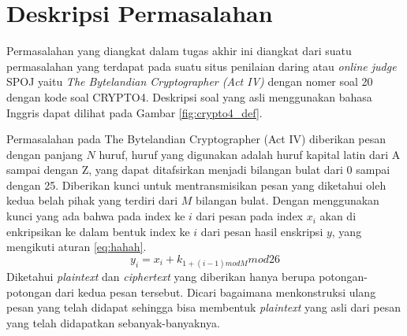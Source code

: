 	\section{Deskripsi Permasalahan}
	\label{chapter:dasar-teori}
	Permasalahan yang diangkat dalam tugas akhir ini diangkat dari suatu permasalahan yang terdapat pada suatu situs penilaian daring atau \textit{online judge} SPOJ yaitu \textit{The Bytelandian Cryptographer (Act IV)} dengan nomer soal 20 dengan kode soal CRYPTO4. Deskripsi soal yang asli menggunakan bahasa Inggris dapat dilihat pada Gambar \ref{fig:crypto4_def}\cite{piwakowski_crypto4_2004}.
	
	
	 Permasalahan pada The Bytelandian Cryptographer (Act IV) diberikan pesan dengan panjang $N$ huruf, huruf yang digunakan adalah huruf kapital latin dari A sampai dengan Z, yang dapat ditafsirkan menjadi bilangan bulat dari 0 sampai dengan 25. Diberikan kunci untuk mentransmisikan pesan yang diketahui oleh kedua belah pihak yang terdiri dari $M$ bilangan bulat. Dengan menggunakan kunci yang ada bahwa pada index ke $i$ dari pesan pada index $x_i$ akan di enkripsikan ke dalam bentuk index ke $i$ dari pesan hasil enskripsi $y$, yang mengikuti aturan \ref{eq:hahah}.
	\begin{equation}
	y_i=x_i+k_{1+(i-1)mod M} mod 26 
	\label{eq:hahah}
	\end{equation}		 
	 Diketahui \textit{plaintext} dan \textit{ciphertext} yang diberikan hanya berupa potongan-potongan dari kedua pesan tersebut. Dicari bagaimana menkonstruksi ulang pesan yang telah didapat sehingga bisa membentuk \textit{plaintext} yang asli dari pesan yang telah didapatkan sebanyak-banyaknya.

